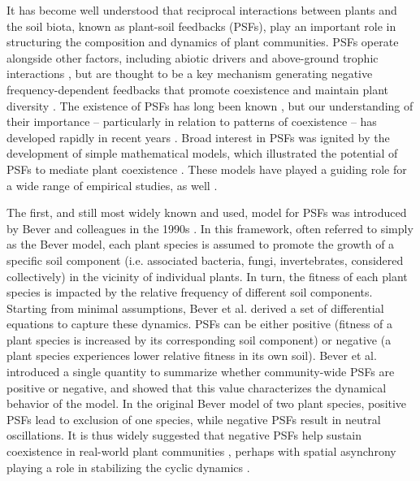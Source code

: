 \documentclass[11pt]{article}
\begin{document}
It has become well understood that reciprocal interactions between plants and the soil biota, known as plant-soil feedbacks (PSFs), play an important role in structuring the composition and dynamics of plant communities. PSFs operate alongside other factors, including abiotic drivers \citep{bennett2019mechanisms} and above-ground trophic interactions \citep{van2009empirical}, but are thought to be a key mechanism generating negative frequency-dependent feedbacks that promote coexistence and maintain plant diversity \citep{kulmatiski2008plant,van2013plant,bever2015maintenance}. The existence of PSFs has long been known \citep{van1993plant,bever1994feedback}, but our understanding of their importance -- particularly in relation to patterns of coexistence -- has developed rapidly in recent years \citep{klironomos2002feedback,petermann2008janzen,mangan2010negative}. Broad interest in PSFs was ignited by the development of simple mathematical models, which illustrated the potential of PSFs to mediate plant coexistence \citep{bever1997incorporating,bever2003soil,ke2015incorporating}. These models have played a guiding role for a wide range of empirical studies, as well \citep{kulmatiski2008plant,kulmatiski2011testing,pernilla2010plant}.

The first, and still most widely known and used, model for PSFs was introduced by Bever and colleagues in the 1990s \citep{bever1992ecological,bever1997incorporating,bever1999dynamics,bever2003soil}. In this framework, often referred to simply as the Bever model, each plant species is assumed to promote the growth of a specific soil component (i.e. associated bacteria, fungi, invertebrates, considered collectively) in the vicinity of individual plants. In turn, the fitness of each plant species is impacted by the relative frequency of different soil components. Starting from minimal assumptions, Bever et al. \citep{bever1997incorporating} derived a set of differential equations to capture these dynamics. PSFs can be either positive (fitness of a plant species is increased by its corresponding soil component) or negative (a plant species experiences lower relative fitness in its own soil). Bever et al. introduced a single quantity to summarize whether community-wide PSFs are positive or negative, and showed that this value characterizes the dynamical behavior of the model. In the original Bever model of two plant species, positive PSFs lead to exclusion of one species, while negative PSFs result in neutral oscillations. It is thus widely suggested that negative PSFs help sustain coexistence in real-world plant communities \citep{kulmatiski2008plant,van2013plant}, perhaps with spatial asynchrony playing a role in stabilizing the cyclic dynamics \citep{revilla2013plant,bever2003soil}.
\end{document}
